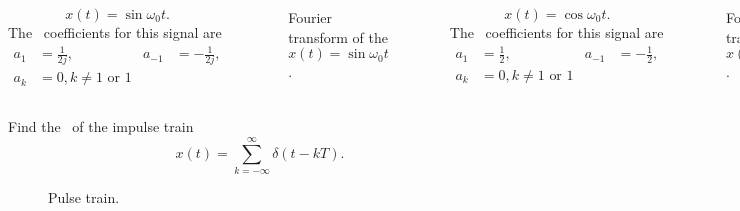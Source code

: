\begin{frame}
{
    \begin{columns}

            \begin{equation*}
                x(t) = \sin \omega_0 t.
            \end{equation*}
            The \fs~coefficients for this signal are
            \begin{align*}
                a_1 &= \frac{1}{2j}, &
                a_{-1} &= -\frac{1}{2j},\\
                a_k &= 0, k \neq 1 \text{ or }1
            \end{align*}
            \pause
            \begin{figure}
              \centering
              
              \caption{Fourier transform of the $x(t) = \sin \omega_0 t$.}\label{fi:ft_sin}
            \end{figure}
            \pause

            \begin{equation*}
                x(t) = \cos \omega_0 t.
            \end{equation*}
            The \fs~coefficients for this signal are
            \begin{align*}
                a_1 &= \frac{1}{2},&
                a_{-1} &= -\frac{1}{2},\\
                a_k &= 0, k \neq 1 \text{ or }1
            \end{align*}
            \pause
            \begin{figure}
              \centering
              
              \caption{Fourier transform of the $x(t) = \cos \omega_0 t$.}\label{fi:ft_cos}
            \end{figure}

    \end{columns}
}
\end{frame}

\begin{frame}[plain]
    \begin{example}
        Find the \ft~of the impulse train
        \begin{equation*}
            x(t) = \sum_{k=-\infty}^{\infty} \delta(t-kT).
        \end{equation*}
    \end{example}
{
    \begin{figure}
        \centering
        
        \caption{Pulse train.}\label{fi:pulse_train}
    \end{figure}
}
\end{frame}

